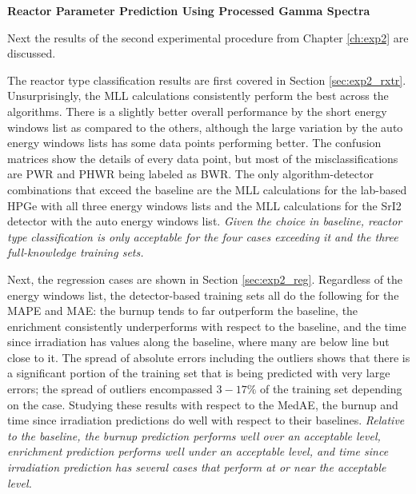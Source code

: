 \noindent \textbf{Reactor Parameter Prediction Using Processed Gamma Spectra}

Next the results of the second experimental procedure from Chapter
\ref{ch:exp2} are discussed.  

The reactor type classification results are first covered in Section
\ref{sec:exp2_rxtr}.  Unsurprisingly, the \gls{MLL} calculations consistently
perform the best across the algorithms. There is a slightly better overall
performance by the short energy windows list as compared to the others,
although the large variation by the auto energy windows lists has some data
points performing better.  The confusion matrices show the details of every
data point, but most of the misclassifications are \gls{PWR} and \gls{PHWR}
being labeled as \gls{BWR}.  The only algorithm-detector combinations that
exceed the baseline are the \gls{MLL} calculations for the lab-based \gls{HPGe}
with all three energy windows lists and the \gls{MLL} calculations for the
\gls{SrI2} detector with the auto energy windows list. \textit{Given the choice
in baseline, reactor type classification is only acceptable for the four cases
exceeding it and the three full-knowledge training sets.}

Next, the regression cases are shown in Section \ref{sec:exp2_reg}.  Regardless
of the energy windows list, the detector-based training sets all do the
following for the \gls{MAPE} and \gls{MAE}: the burnup tends to far outperform
the baseline, the enrichment consistently underperforms with respect to the
baseline, and the time since irradiation has values along the baseline, where
many are below line but close to it.  The spread of absolute errors including
the outliers shows that there is a significant portion of the training set that
is being predicted with very large errors; the spread of outliers encompassed
$3-17\%$ of the training set depending on the case.  Studying these results
with respect to the \gls{MedAE}, the burnup and time since irradiation
predictions do well with respect to their baselines.  \textit{Relative to the
baseline, the burnup prediction performs well over an acceptable level,
enrichment prediction performs well under an acceptable level, and time since
irradiation prediction has several cases that perform at or near the acceptable
level.} 

